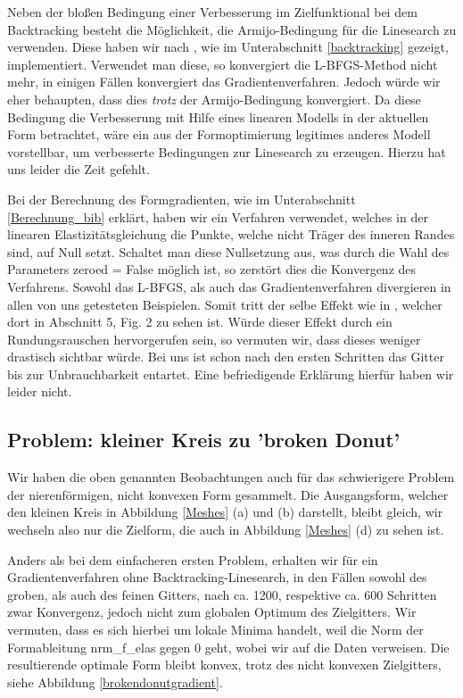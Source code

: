 Neben der bloßen Bedingung einer Verbesserung im Zielfunktional bei dem Backtracking besteht die Möglichkeit, die Armijo-Bedingung für die Linesearch zu verwenden. Diese haben wir nach \cite{Nocedal}, wie im Unterabschnitt  \ref{backtracking} gezeigt,  implementiert. Verwendet man diese, so konvergiert die L-BFGS-Method nicht mehr, in einigen Fällen konvergiert das Gradientenverfahren. Jedoch würde wir eher behaupten, dass dies \textit{trotz} der Armijo-Bedingung konvergiert. Da diese Bedingung die Verbesserung mit Hilfe eines linearen Modells in der aktuellen Form betrachtet, wäre ein aus der Formoptimierung legitimes anderes Modell vorstellbar, um verbesserte Bedingungen zur Linesearch zu erzeugen. Hierzu hat uns leider die Zeit gefehlt.

Bei der Berechnung des Formgradienten, wie im Unterabschnitt \ref{Berechnung_bib} erklärt, haben wir ein Verfahren verwendet, welches in der linearen Elastizitätsgleichung die Punkte, welche nicht Träger des inneren Randes sind, auf Null setzt. Schaltet man diese Nullsetzung aus, was durch die Wahl des Parameters \textsf{zeroed = False} möglich ist, so zerstört dies die Konvergenz des Verfahrens. Sowohl das L-BFGS, als auch das Gradientenverfahren divergieren in allen von uns getesteten Beispielen. Somit tritt der selbe Effekt wie in \cite{bfgs2}, welcher dort in Abschnitt 5, Fig. 2 zu sehen ist. Würde dieser Effekt durch ein Rundungsrauschen hervorgerufen sein, so vermuten wir, dass dieses weniger drastisch sichtbar würde. Bei uns ist schon nach den ersten Schritten das Gitter bis zur Unbrauchbarkeit entartet. Eine befriedigende Erklärung hierfür haben wir leider nicht.

\subsection{Problem: kleiner Kreis zu 'broken Donut'}\label{subsect_donut}

Wir haben die oben genannten Beobachtungen auch für das schwierigere Problem der nierenförmigen, nicht konvexen Form gesammelt. Die Ausgangsform, welcher den kleinen Kreis in Abbildung \ref{Meshes} (a) und (b) darstellt, bleibt gleich, wir wechseln also nur die Zielform, die auch in Abbildung \ref{Meshes} (d) zu sehen ist. 

Anders als bei dem einfacheren ersten Problem, erhalten wir für ein Gradientenverfahren ohne Backtracking-Linesearch, in den Fällen sowohl des groben, als auch des feinen Gitters, nach ca. 1200, respektive ca. 600 Schritten zwar Konvergenz, jedoch nicht zum globalen Optimum des Zielgitters. Wir vermuten, dass es sich hierbei um lokale Minima handelt, weil die Norm der Formableitung \textsf{nrm\_f\_elas} gegen $0$ geht, wobei wir auf die Daten verweisen. Die resultierende optimale Form bleibt konvex, trotz des nicht konvexen Zielgitters, siehe Abbildung
\ref{brokendonutgradient}. 

